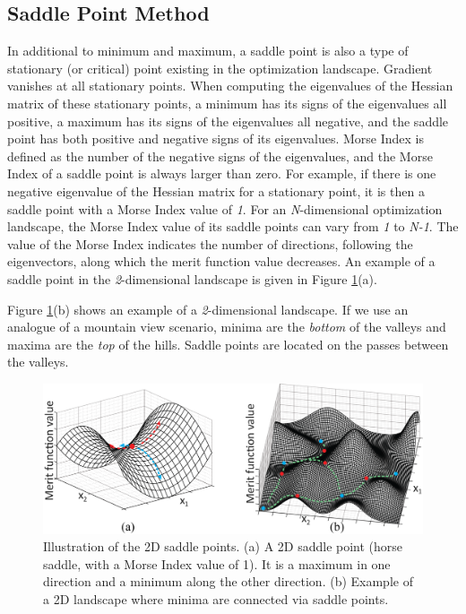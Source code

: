 \subsection{Saddle Point Method} \label{Explaination_critical_points}
In additional to minimum and maximum, a saddle point is also a type of stationary (or critical) point existing in the optimization landscape. Gradient vanishes at all stationary points. When computing the eigenvalues of the Hessian matrix of these stationary points, a minimum has its signs of the eigenvalues all positive, a maximum has its signs of the eigenvalues all negative, and the saddle point has both positive and negative signs of its eigenvalues. Morse Index is defined as the number of the negative signs of the eigenvalues, and the Morse Index of a saddle point is always larger than zero. For example, if there is one negative eigenvalue of the Hessian matrix for a stationary point, it is then a saddle point with a Morse Index value of \textit{1}. For an \textit{N}-dimensional optimization landscape, the Morse Index value of its saddle points can vary from \textit{1} to \textit{N-1}.  The value of the Morse Index indicates the number of directions, following the eigenvectors, along which the merit function value decreases. An example of a saddle point in the \textit{2}-dimensional landscape is given in Figure \ref{fig: saddle_illustration}(a). 

Figure \ref{fig: saddle_illustration}(b) shows an example of a \textit{2}-dimensional landscape. If we use an analogue of a mountain view scenario, minima are the \textit{bottom} of the valleys and maxima are the \textit{top} of the hills. Saddle points are located on the passes between the valleys. 

\begin{figure}
    \centering
    \includegraphics[scale=0.58]{chapter-1/figures/saddle_point_plotted.png}
    \caption{Illustration of the 2D saddle points. (a) A 2D saddle point (horse saddle, with a Morse Index value of 1). It is a maximum in one direction and a minimum along the other direction. (b) Example of a 2D landscape where minima are connected via saddle points. }
    \label{fig: saddle_illustration}
\end{figure} 

